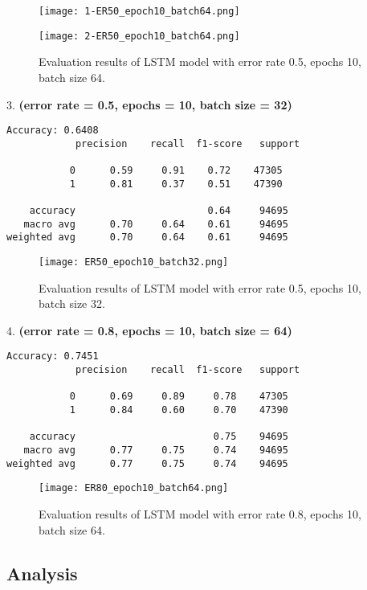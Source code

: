 \begin{figure}[h!]
    \centering
    \texttt{[image: 1-ER50\_epoch10\_batch64.png]}
    \label{fig:lstm_results_0.5_10_64-1}
\end{figure}
\begin{figure}[h!]
    \centering
    \texttt{[image: 2-ER50\_epoch10\_batch64.png]}
    \caption{Evaluation results of LSTM model with error rate 0.5, epochs 10, batch size 64.}
    \label{fig:lstm_results_0.5_10_64-2}
\end{figure}

3. \textbf{(error rate = 0.5, epochs = 10, batch size = 32)}
\begin{verbatim}
Accuracy: 0.6408
            precision    recall  f1-score   support

           0      0.59     0.91    0.72    47305
           1      0.81     0.37    0.51    47390

    accuracy                       0.64     94695
   macro avg      0.70     0.64    0.61     94695
weighted avg      0.70     0.64    0.61     94695
\end{verbatim}

\begin{figure}[h!]
    \centering
    \texttt{[image: ER50\_epoch10\_batch32.png]}
    \caption{Evaluation results of LSTM model with error rate 0.5, epochs 10, batch size 32.}
    \label{fig:lstm_results_0.5_10_32}
\end{figure}

4. \textbf{(error rate = 0.8, epochs = 10, batch size = 64)}
\begin{verbatim}
Accuracy: 0.7451
            precision    recall  f1-score   support

           0      0.69     0.89     0.78    47305
           1      0.84     0.60     0.70    47390

    accuracy                        0.75    94695
   macro avg      0.77     0.75     0.74    94695
weighted avg      0.77     0.75     0.74    94695
\end{verbatim}

\begin{figure}[h!]
    \centering
    \texttt{[image: ER80\_epoch10\_batch64.png]}
    \caption{Evaluation results of LSTM model with error rate 0.8, epochs 10, batch size 64.}
    \label{fig:lstm_results_0.8_10_64}
\end{figure}

\subsection{Analysis}

